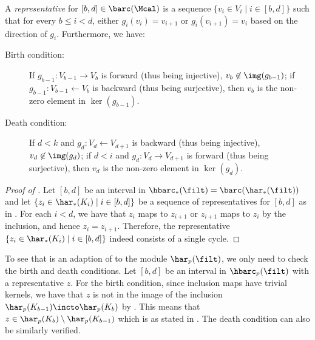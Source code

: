 \begin{definition}
\label{dfn:rep-cls-ori}
A \emph{representative} for $[b,d]\in\barc(\Mcal)$
is a sequence $\{v_i\in V_i\mid i\in[b,d]\}$
such that  for every $b\leq i<d$, 
either $g_i(v_i)=v_{i+1}$ or
$g_i(v_{i+1})=v_{i}$
based on the direction of $g_i$.
Furthermore, we have:
\begin{description}
    \item[Birth condition:] 
    If $g_{b-1}:V_{b-1}\to V_{b}$ is forward
    (thus being injective),
    $v_b\not\in\img(g_{b-1})$;
    if $g_{b-1}:V_{b-1}\leftarrow V_{b}$ is backward
    (thus being  surjective),
    then $v_b$ is the non-zero element in $\ker(g_{b-1})$.
    
    \item[Death condition:]
    If $d<k$ and
    $g_{d}:V_{d}\leftarrow V_{d+1}$ is backward
    (thus being injective),
    $v_d\not\in\img(g_{d})$;
    if $d<i$
    and $g_{d}:V_{d}\to V_{d+1}$ is forward
    (thus being surjective),
    then $v_d$ is the non-zero element in $\ker(g_{d})$.
\end{description}
\end{definition}

\begin{proof}[Proof of ]
Let $[b,d]$ be an interval in $\hbarc_*(\filt)=\barc(\har_*(\filt))$
and let $\{z_i\in\har_*(K_i)\mid i\in[b,d]\}$
be a sequence of representatives for $[b,d]$
as in .
For each $i<d$,
we have that $z_i$
maps to $z_{i+1}$ 
or $z_{i+1}$
maps to $z_{i}$ 
by the inclusion,
and hence $z_i=z_{i+1}$.
Therefore, the representative
$\{z_i\in\har_*(K_i)\mid i\in[b,d]\}$ indeed
consists of a single cycle.
\end{proof}

To see that  is an adaption of 
to the module $\har_p(\filt)$, we only need to check the birth
and death conditions.
Let $[b,d]$ be an interval in $\hbarc_p(\filt)$
with a representative $z$.
For the birth condition, since inclusion maps have trivial kernels,
we have that $z$ is not in the image of the inclusion $\har_p(K_{b-1})\incto \har_p(K_b)$
by .
This means that 
$z\in\har_p(K_{b})\setminus\har_p(K_{b-1})$ 
which is as stated in .
The death condition can also be similarly verified.
%
%
